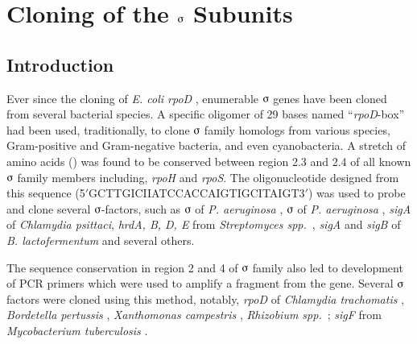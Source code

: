 \chapter{Cloning of the $\sigmaup$ Subunits}

\section{Introduction}
\label{chap3:intro}

Ever since the cloning of \emph{E. coli rpoD} \citep{Burton1981},
enumerable $\sigmaup$ genes have been cloned from several
bacterial species. A specific oligomer of 29 bases named
``\textit{rpoD}-box'' \citep{Tanaka1988} had been used,
traditionally, to clone $\sigmaup$ family homologs from
various species, Gram-positive and Gram-negative bacteria, and
even cyanobacteria. A stretch of amino acids ()
was found to be conserved between region 2.3 and 2.4 of all known
$\sigmaup$ family members including, \textit{rpoH} and
\textit{rpoS}\@. The oligonucleotide designed from this sequence
(5$'$G\-C\-T\-T\-G\-I\-C\-I\-I\-A\-T\-C\-C\-A\-C\-C\-A\-I\-G\-T\-I\-G\-C\-I\-T\-A\-I\-G\-T3$'$)
was used to probe and clone several $\sigmaup$-factors, such as
$\sigmaup$ of \textit{P. aeruginosa} \citep{Tanaka1991},
$\sigmaup$ of \textit{P. aeruginosa} \citep{Naczynski1995},
\textit{sigA} of \textit{Chlamydia psittaci}, \textit{hrdA, B, D,
E} from \textit{Streptomyces spp.}\
\citep{Kormanec1992,Tanaka1991b}, \textit{sigA} and \textit{sigB}
of \textit{B. lactofermentum} \citep{Oguiza1996} and several
others.

The sequence conservation in region 2 and 4 of $\sigmaup$
family also led to development of PCR primers which were used to
amplify a fragment from the gene. Several $\sigmaup$ factors were
cloned using this method, notably, \textit{rpoD} of
\textit{Chlamydia trachomatis} \citep{Engel1990},
\textit{Bordetella pertussis} \citep{Steffen1997},
\textit{Xanthomonas campestris} \citep{Tseng1997},
\textit{Rhizobium spp.}\ \citep{Rushing1995,Luka1996};
\textit{sigF} from \textit{Mycobacterium tuberculosis}
\citep{DeMaio1996}.

